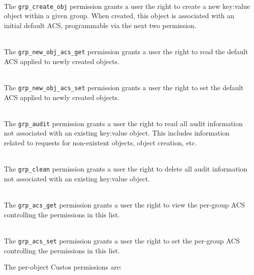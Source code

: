 \begin{packed_desc}
\item[\texttt{grp\_create\_obj}] \hfill \\ The
  \texttt{grp\_create\_obj} permission grants a user the right to
  create a new key:value object within a given group. When created,
  this object is associated with an initial default ACS, programmable
  via the next two permission.
\item[\texttt{grp\_new\_obj\_acs\_get}] \hfill \\ The
  \texttt{grp\_new\_obj\_acs\_get} permission grants a user the right
  to read the default ACS applied to newly created objects.
\item[\texttt{grp\_new\_obj\_acs\_set}] \hfill \\ The
  \texttt{grp\_new\_obj\_acs\_set} permission grants a user the right
  to set the default ACS applied to newly created objects.
\item[\texttt{grp\_audit}] \hfill \\ The \texttt{grp\_audit}
  permission grants a user the right to read all audit information not
  associated with an existing key:value object. This includes
  information related to requests for non-existent objects, object
  creation, etc.
\item[\texttt{grp\_clean}] \hfill \\ The \texttt{grp\_clean}
  permission grants a user the right to delete all audit information
  not associated with an existing key:value object.
\item[\texttt{grp\_acs\_get}] \hfill \\ The \texttt{grp\_acs\_get}
  permission grants a user the right to view the per-group ACS
  controlling the permissions in this list.
\item[\texttt{grp\_acs\_set}] \hfill \\ The \texttt{grp\_acs\_set}
  permission grants a user the right to set the per-group ACS
  controlling the permissions in this list.
\end{packed_desc}

\noindent
The per-object Custos permissions are:


